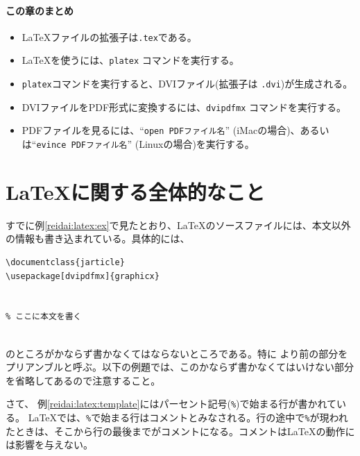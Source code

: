 \paragraph{この章のまとめ}

\begin{itemize}
\item \LaTeX ファイルの拡張子は\texttt{.tex}である。
\item \LaTeX を使うには、\verb|platex| コマンドを実行する。
\item \texttt{platex}コマンドを実行すると、DVIファイル(拡張子は \texttt{.dvi})が生成される。
\item DVIファイルをPDF形式に変換するには、\verb|dvipdfmx| コマンドを実行する。
\item PDFファイルを見るには、``\verb|open PDFファイル名|'' (iMacの場合)、あるいは``\verb|evince PDFファイル名|'' (Linuxの場合)を実行する。
\end{itemize}

\section{\LaTeX に関する全体的なこと}
\label{sec:latex:global}

すでに例\ref{reidai:latex:ex}で見たとおり、\LaTeX のソースファイルには、本文以外の情報も書き込まれている。具体的には、
\begin{reidai}
\label{reidai:latex:template}
\begin{verbatim}
\documentclass{jarticle}
\usepackage[dvipdfmx]{graphicx}


% ここに本文を書く


\end{verbatim}
\end{reidai}
のところがかならず書かなくてはならないところである。特に \verb||より前の部分をプリアンブルと呼ぶ。以下の例題では、このかならず書かなくてはいけない部分を省略してあるので注意すること。

さて、 例\ref{reidai:latex:template}にはパーセント記号(\texttt{\%})で始まる行が書かれている。 \LaTeX では、\texttt{\%}で始まる行はコメントとみなされる。行の途中で\texttt{\%}が現われたときは、そこから行の最後までがコメントになる。コメントは\LaTeX の動作には影響を与えない。


